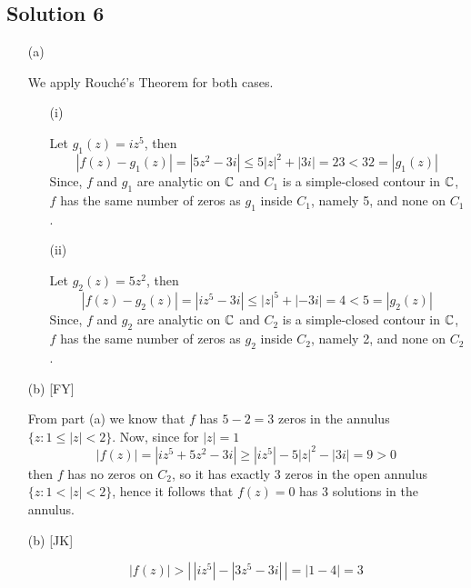 \subsection*{Solution 6}

\begin{itemize}
\item[(a)]

We apply Rouch\'{e}'s Theorem for both cases.

\begin{itemize}
\item[(i)]

Let $g_1(z)=iz^5$, then
\[
|f(z)-g_1(z)| = |5z^2-3i| \le 5|z|^2 +|3i| = 23 < 32 = |g_1(z)|
\]
Since, $f$ and $g_1$ are analytic on $\mathbb{C}$ and $C_1$ is a
simple-closed contour in $\mathbb{C}$, $f$ has the same number of zeros
as $g_1$ inside $C_1$, namely 5, and none on $C_1$.

\item[(ii)]

Let $g_2(z)=5z^2$, then
\[
|f(z)-g_2(z)| = |iz^5-3i| \le |z|^5+|-3i| = 4 < 5 = |g_2(z)|
\]
Since, $f$ and $g_2$ are analytic on $\mathbb{C}$ and $C_2$ is a
simple-closed contour in $\mathbb{C}$, $f$ has the same number of zeros
as $g_2$ inside $C_2$, namely 2, and none on $C_2$.

\end{itemize}

\item[(b)][FY]

From part (a) we know that $f$ has $5-2=3$ zeros in the annulus
$\{z:1\le|z|<2\}$.
Now, since for $|z|=1$
\[
|f(z)| = |iz^5+5z^2-3i| \ge |iz^5| - 5|z|^2 - |3i| = 9 > 0
\]
then $f$ has no zeros on $C_2$, so it has exactly 3 zeros in the open
annulus $\{z:1<|z|<2\}$, hence it follows that $f(z)=0$ has 3 solutions
in the annulus.

\item[(b)][JK]

\[
|f(z)| > \left|\, \left| iz^5 \right| - \left| 3z^5 - 3i \right| \,\right| = |1-4| = 3
\]


\end{itemize}

